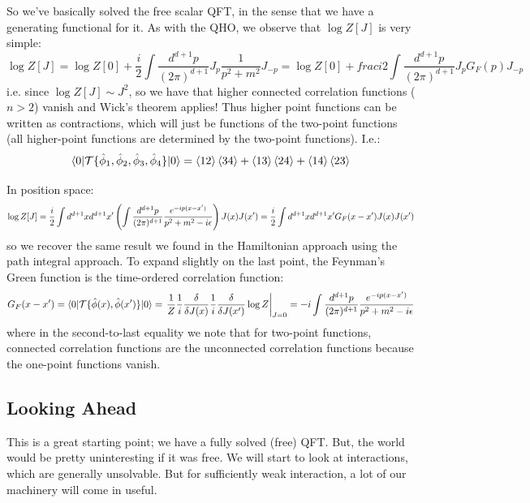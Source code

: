So we've basically solved the free scalar QFT, in the sense that we have a generating functional for it. As with the QHO, we observe that $\log Z[J]$ is very simple:
\begin{equation}
    \log Z[J] = \log Z[0] + \frac{i}{2}\int \frac{d^{d+1}p}{(2\pi)^{d+1}}J_p\frac{1}{p^2 + m^2}J_{-p} = \log Z[0] + frac{i}{2}\int \frac{d^{d+1}p}{(2\pi)^{d+1}}J_pG_F(p)J_{-p}
\end{equation}
i.e. since $\log Z[J] \sim J^2$, so we have that higher connected correlation functions ($n > 2$) vanish and Wick's theorem applies! Thus higher point functions can be written as contractions, which will just be functions of the two-point functions (all higher-point functions are determined by the two-point functions). I.e.:
\begin{equation}
    \langle 0 \rvert\mathcal{T}\{\hat{\phi}_1, \hat{\phi}_2, \hat{\phi}_3, \hat{\phi}_4\}\lvert 0 \rangle = \left< 12 \right>\left< 34 \right> + \left< 13 \right>\left< 24 \right> + \left< 14 \right>\left< 23 \right>
\end{equation}

In position space:
\begin{equation}
    \log Z[J] = \frac{i}{2}\int d^{d+1}xd^{d+1}x'\left(\int \frac{d^{d+1}p}{(2\pi)^{d+1}}\frac{e^{-ip(x-x')}}{p^2 + m^2 - i\epsilon}\right) J(x)J(x') = \frac{i}{2}\int d^{d+1}xd^{d+1}x' G_F(x-x')J(x)J(x')
\end{equation}
so we recover the same result we found in the Hamiltonian approach using the path integral approach. To expand slightly on the last point, the Feynman's Green function is the time-ordered correlation function:
\begin{equation}
    G_F(x -x') = \langle 0 \rvert\mathcal{T}\{\hat{\phi}(x), \hat{\phi}(x')\}\lvert 0 \rangle = \left.\frac{1}{Z}\frac{1}{i}\frac{\delta }{\delta J(x)}\frac{1}{i}\frac{\delta }{\delta J(x')} \log Z\right|_{J=0} = -i\int \frac{d^{d+1}p}{(2\pi)^{d+1}}\frac{e^{-ip(x-x')}}{p^2 + m^2 - i\epsilon}
\end{equation}
where in the second-to-last equality we note that for two-point functions, connected correlation functions are the unconnected correlation functions because the one-point functions vanish.

\subsection{Looking Ahead}
This is a great starting point; we have a fully solved (free) QFT. But, the world would be pretty uninteresting if it was free. We will start to look at interactions, which are generally unsolvable. But for sufficiently weak interaction, a lot of our machinery will come in useful.


